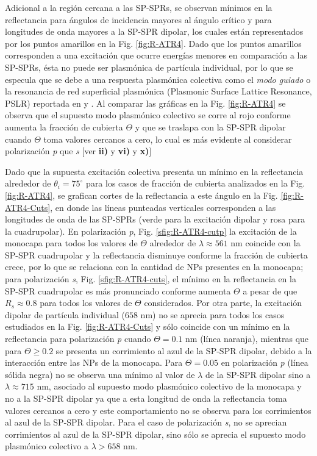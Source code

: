 Adicional a la región cercana a las SP-SPRs, se observan mínimos en la reflectancia para ángulos de incidencia mayores al ángulo crítico y para longitudes de onda mayores a la SP-SPR dipolar, los cuales están  representados por los puntos amarillos en la Fig. \ref{fig:R-ATR4}. Dado que los puntos amarillos corresponden a una excitación que ocurre energías  menores en comparación a las SP-SPRs, ésta no puede ser plasmónica de partícula individual,  por lo que se especula que se debe a una respuesta plasmónica colectiva como el \emph{modo guiado} o la resonancia de red superficial plasmónica (Plasmonic Surface Lattice Resonance, PSLR) reportada en \cite{kabashin2009plasmonic} y \cite{danilov2018ultra}. Al comparar las gráficas en la  Fig.  \ref{fig:R-ATR4} se observa que el supuesto modo plasmónico colectivo se corre al rojo  conforme aumenta la fracción de cubierta $\Theta$ y que se traslapa con la SP-SPR dipolar cuando $\Theta$ toma valores cercanos a cero, lo cual es más evidente al considerar polarización \emph{p} que \emph{s} [ver \textbf{ii)} y \textbf{vi)} y \textbf{x)}] 

Dado que la supuesta excitación colectiva presenta un mínimo en la reflectancia  alrededor de $\theta_i = 75^\circ$ para los casos de fracción de cubierta analizados en la Fig.  \ref{fig:R-ATR4}, se grafican cortes de la reflectancia a este ángulo en la Fig. \ref{fig:R-ATR4-Cuts}, en donde las líneas punteadas verticales corresponden a las longitudes de onda de las SP-SPRs (verde para la excitación dipolar y rosa para la cuadrupolar). En polarización \emph{p}, Fig. \ref{sfig:R-ATR4-cutp} la excitación de la monocapa para todos los valores de $\Theta$ alrededor de $\lambda \approx 561$ nm coincide con la SP-SPR cuadrupolar y la reflectancia disminuye conforme la fracción de cubierta crece, por lo que se relaciona con la cantidad de NPs presentes en la monocapa; para polarización \emph{s}, Fig. \ref{sfig:R-ATR4-cuts}, el mínimo en la reflectancia en la SP-SPR cuadrupolar es más pronunciado conforme aumenta $\Theta$ a pesar de que $R_s\approx 0.8$ para todos los valores de $\Theta$ considerados. Por otra parte, la excitación dipolar de partícula individual ($658$ nm) no se aprecia para todos los casos estudiados en la Fig. \ref{fig:R-ATR4-Cuts} y sólo coincide con un mínimo en la reflectancia para polarización \emph{p} cuando $\Theta=0.1$ nm (línea naranja), mientras que para $\Theta \geq 0.2$ se presenta un corrimiento al azul de la SP-SPR dipolar, debido a la interacción entre las NPs de la monocapa. Para $\Theta=0.05$ en polarización \emph{p} (línea sólida negra) no se observa una mínimo al valor de $\lambda$ de la SP-SPR dipolar sino a $\lambda\approx 715$ nm, asociado al supuesto modo plasmónico colectivo de la monocapa y no a la SP-SPR dipolar ya que a esta longitud de onda la reflectancia toma valores cercanos a cero y este comportamiento no se observa para los corrimientos al azul de la SP-SPR dipolar. Para el caso de polarización \emph{s}, no se aprecian corrimientos al azul de la SP-SPR dipolar, sino sólo se aprecia el supuesto modo plasmónico colectivo a $\lambda>658$ nm.

